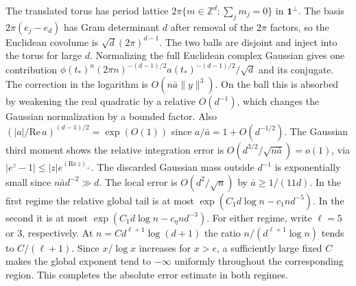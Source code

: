 The translated torus has period lattice $2\pi\{m\in\mathbb Z^d:\sum_jm_j=0\}$ in $\mathbf1^\perp$. The basis $2\pi(e_j-e_d)$ has Gram determinant $d$ after removal of the $2\pi$ factors, so the Euclidean covolume is $\sqrt d(2\pi)^{d-1}$. The two balls are disjoint and inject into the torus for large $d$. Normalizing the full Euclidean complex Gaussian gives one contribution $\phi(t_*)^n(2\pi n)^{-(d-1)/2}a(t_*)^{-(d-1)/2}/\sqrt d$ and its conjugate. The correction in the logarithm is $O(n\bar a \|y\|^3)$. On the ball this is absorbed by weakening the real quadratic by a relative $O(d^{-1})$, which changes the Gaussian normalization by a bounded factor. Also $(|a|/\mathrm{Re}\,a)^{(d-1)/2}=\exp(O(1))$ since $a/\bar a=1+O(d^{-1/2})$. The Gaussian third moment shows the relative integration error is $O(d^{3/2}/\sqrt{n\bar a})=o(1)$, via $|e^z-1|\le |z|e^{(\mathrm{Re}\,z)_+}$. The discarded Gaussian mass outside $d^{-1}$ is exponentially small since $n\bar a d^{-2}\gg d$. The local error is $O(d^2/\sqrt n)$ by $\bar a\ge1/(11d)$. In the first regime the relative global tail is at most $\exp(C_1d\log n-c_1 n d^{-5})$. In the second it is at most $\exp(C_1d\log n-c_\eta n d^{-3})$. For either regime, write $\ell=5$ or $3$, respectively. At $n=C d^{\ell+1}\log(d+1)$ the ratio $n/(d^{\ell+1}\log n)$ tends to $C/(\ell+1)$. Since $x/\log x$ increases for $x>e$, a sufficiently large fixed $C$ makes the global exponent tend to $-\infty$ uniformly throughout the corresponding region. This completes the absolute error estimate in both regimes.
